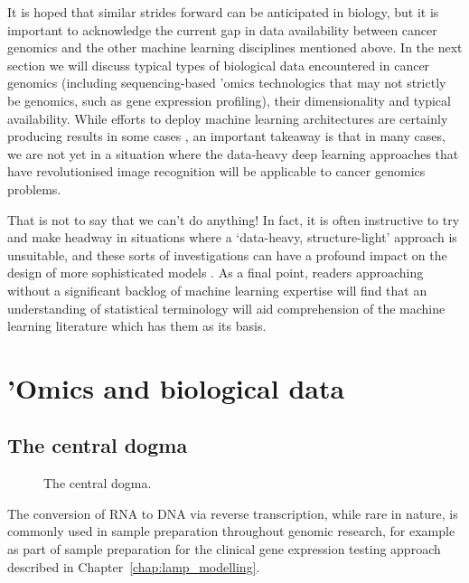 \documentclass[thesis.tex]{subfiles}
\begin{document}
It is hoped that similar strides forward can be anticipated in biology, but it is important to acknowledge the current gap in data availability between cancer genomics and the other machine learning disciplines mentioned above. In the next section we will discuss typical types of biological data encountered in cancer genomics (including sequencing-based 'omics technologics that may not strictly be genomics, such as gene expression profiling), their dimensionality and typical availability. While efforts to deploy machine learning architectures are certainly producing results in some cases \citep{dubourg-felonneau_flatsomatic_2019, dubourg-felonneau_learning_2019}, an important takeaway is that in many cases, we are not yet in a situation where the data-heavy deep learning approaches that have revolutionised image recognition will be applicable to cancer genomics problems. 

That is not to say that we can't do anything! In fact, it is often instructive to try and make headway in situations where a `data-heavy, structure-light' approach is unsuitable, and these sorts of investigations can have a profound impact on the design of more sophisticated models \citep{buhlmann_high-dimensional_2014}. As a final point, readers approaching without a significant backlog of machine learning expertise will find that an understanding of statistical terminology will aid comprehension of the machine learning literature which has them as its basis.

\section{'Omics and biological data}

\subsection{The central dogma}
\begin{figure}[htbp]
\centering
{}
\caption{The central dogma.\label{fig:centraldogma}}
\end{figure}
The conversion of RNA to DNA via reverse transcription, while rare in nature, is commonly used in sample preparation throughout genomic research, for example as part of sample preparation for the clinical gene expression testing approach described in Chapter~\ref{chap:lamp_modelling}. 
\end{document}
